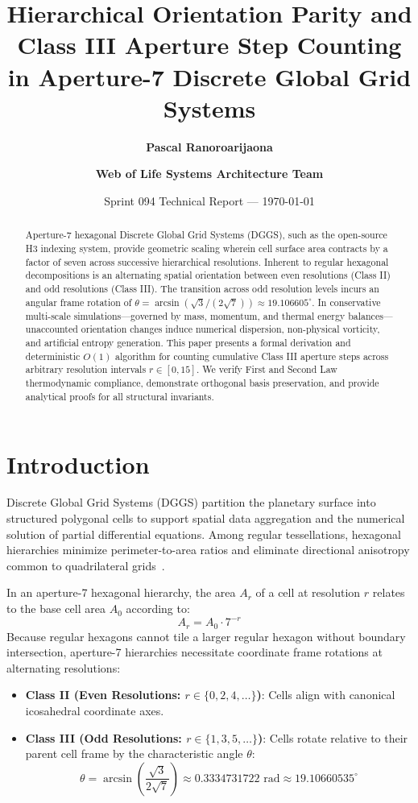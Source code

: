 \documentclass[11pt,a4paper]{article}
\title{\textbf{Hierarchical Orientation Parity and Class III Aperture Step Counting\\in Aperture-7 Discrete Global Grid Systems}}
\author{\textbf{Pascal Ranoroarijaona} \and \textbf{Web of Life Systems Architecture Team}}
\date{Sprint 094 Technical Report --- \today}
\theoremstyle{definition}
\begin{document}
\maketitle

\begin{abstract}
Aperture-7 hexagonal Discrete Global Grid Systems (DGGS), such as the open-source H3 indexing system, provide geometric scaling wherein cell surface area contracts by a factor of seven across successive hierarchical resolutions. Inherent to regular hexagonal decompositions is an alternating spatial orientation between even resolutions (Class II) and odd resolutions (Class III). The transition across odd resolution levels incurs an angular frame rotation of $\theta = \arcsin(\sqrt{3}/(2\sqrt{7})) \approx 19.106605^\circ$. In conservative multi-scale simulations---governed by mass, momentum, and thermal energy balances---unaccounted orientation changes induce numerical dispersion, non-physical vorticity, and artificial entropy generation. This paper presents a formal derivation and deterministic $O(1)$ algorithm for counting cumulative Class III aperture steps across arbitrary resolution intervals $r \in [0, 15]$. We verify First and Second Law thermodynamic compliance, demonstrate orthogonal basis preservation, and provide analytical proofs for all structural invariants.
\end{abstract}

\section{Introduction}

Discrete Global Grid Systems (DGGS) partition the planetary surface into structured polygonal cells to support spatial data aggregation and the numerical solution of partial differential equations. Among regular tessellations, hexagonal hierarchies minimize perimeter-to-area ratios and eliminate directional anisotropy common to quadrilateral grids~\cite{sahr2003geodesic}.

In an aperture-7 hexagonal hierarchy, the area $A_r$ of a cell at resolution $r$ relates to the base cell area $A_0$ according to:
\begin{equation}
A_r = A_0 \cdot 7^{-r}
\end{equation}
Because regular hexagons cannot tile a larger regular hexagon without boundary intersection, aperture-7 hierarchies necessitate coordinate frame rotations at alternating resolutions:
\begin{itemize}
    \item \textbf{Class II (Even Resolutions: $r \in \{0, 2, 4, \dots\}$)}: Cells align with canonical icosahedral coordinate axes.
    \item \textbf{Class III (Odd Resolutions: $r \in \{1, 3, 5, \dots\}$)}: Cells rotate relative to their parent cell frame by the characteristic angle $\theta$:
    \begin{equation}
    \theta = \arcsin\left(\frac{\sqrt{3}}{2\sqrt{7}}\right) \approx 0.3334731722 \text{ rad} \approx 19.10660535^\circ
    \end{equation}
\end{itemize}
\end{document}
